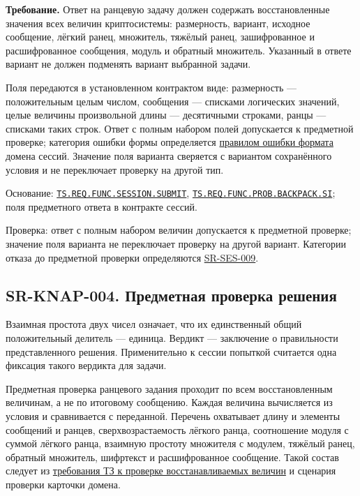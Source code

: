 \documentclass[12pt,a4paper]{article}
\begin{document}
\textbf{Требование.} Ответ на ранцевую задачу должен содержать восстановленные значения всех величин криптосистемы: размерность, вариант, исходное сообщение, лёгкий ранец, множитель, тяжёлый ранец, зашифрованное и расшифрованное сообщения, модуль и обратный множитель. Указанный в ответе вариант не должен подменять вариант выбранной задачи.

Поля передаются в установленном контрактом виде: размерность --- положительным целым числом, сообщения --- списками логических значений, целые величины произвольной длины --- десятичными строками, ранцы --- списками таких строк. Ответ с полным набором полей допускается к предметной проверке; категория ошибки формы определяется {\hyperlink{sr-ses-009-ошибка-формата}{правилом ошибки формата}} домена сессий. Значение поля варианта сверяется с вариантом сохранённого условия и не переключает проверку на другой тип.

Основание: {\href{../02\_Техническое\_задание/DOC-02\_Техническое\_задание.pdf\#ts-req-func-session-submit}{\texttt{TS.\allowbreak{}REQ.\allowbreak{}FUNC.\allowbreak{}SESSION.\allowbreak{}SUBMIT}}}, {\href{../02\_Техническое\_задание/DOC-02\_Техническое\_задание.pdf\#ts-req-func-prob-backpack-si}{\texttt{TS.\allowbreak{}REQ.\allowbreak{}FUNC.\allowbreak{}PROB.\allowbreak{}BACKPACK.\allowbreak{}SI}}}; поля предметного ответа в контракте сессий.

Проверка: ответ с полным набором величин допускается к предметной проверке; значение поля варианта не переключает проверку на другой вариант. Категории отказа до предметной проверки определяются {\hyperlink{sr-ses-009}{SR-SES-009}}.

\subsection{SR-KNAP-004. Предметная проверка решения}\label{sr-knap-004-ux43fux440ux435ux434ux43cux435ux442ux43dux430ux44f-ux43fux440ux43eux432ux435ux440ux43aux430-ux440ux435ux448ux435ux43dux438ux44f}

\hypertarget{sr-knap-004-предметная-проверка-решения}{}

\hypertarget{sr-knap-004}{}

Взаимная простота двух чисел означает, что их единственный общий положительный делитель --- единица. Вердикт --- заключение о правильности представленного решения. Применительно к сессии попыткой считается одна фиксация такого вердикта для задачи.

Предметная проверка ранцевого задания проходит по всем восстановленным величинам, а не по итоговому сообщению. Каждая величина вычисляется из условия и сравнивается с переданной. Перечень охватывает длину и элементы сообщений и ранцев, сверхвозрастаемость лёгкого ранца, соотношение модуля с суммой лёгкого ранца, взаимную простоту множителя с модулем, тяжёлый ранец, обратный множитель, шифртекст и расшифрованное сообщение. Такой состав следует из {\href{../02\_Техническое\_задание/DOC-02\_Техническое\_задание.pdf\#doc-02-техническое-задание}{требования ТЗ к проверке восстанавливаемых величин}} и сценария проверки карточки домена.
\end{document}
